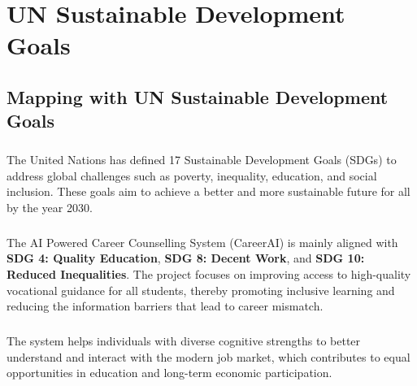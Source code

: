 \chapter{UN Sustainable Development Goals}

\section{Mapping with UN Sustainable Development Goals}

\paragraph{}
The United Nations has defined 17 Sustainable Development Goals (SDGs) to address global challenges such as poverty, inequality, education, and social inclusion. These goals aim to achieve a better and more sustainable future for all by the year 2030.

\paragraph{}
The AI Powered Career Counselling System (CareerAI) is mainly aligned with \textbf{SDG 4: Quality Education}, \textbf{SDG 8: Decent Work}, and \textbf{SDG 10: Reduced Inequalities}. The project focuses on improving access to high-quality vocational guidance for all students, thereby promoting inclusive learning and reducing the information barriers that lead to career mismatch.

\paragraph{}
The system helps individuals with diverse cognitive strengths to better understand and interact with the modern job market, which contributes to equal opportunities in education and long-term economic participation.


